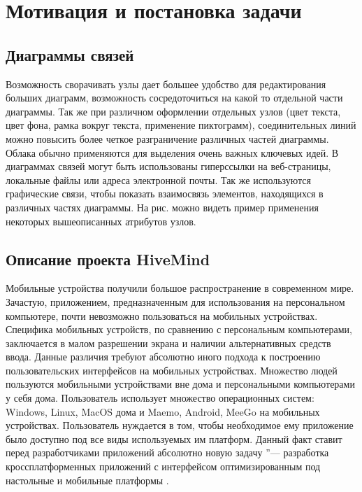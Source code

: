 \newpage

\chapter{Мотивация и постановка задачи}
\label{ch:chapter_1}

\section{Диаграммы связей}

Возможность сворачивать узлы дает большее удобство для редактирования больших
диаграмм, возможность сосредоточиться на какой то отдельной части диаграммы. Так
же при различном оформлении отдельных узлов (цвет текста, цвет фона, рамка
вокруг текста, применение пиктограмм), соединительных линий можно повысить более
четкое разграничение различных частей диаграммы. Облака обычно применяются для
выделения очень важных ключевых идей. В диаграммах связей могут быть
использованы гиперссылки на веб-страницы, локальные файлы или адреса электронной
почты. Так же используются графические связи, чтобы показать взаимосвязь
элементов, находящихся в различных частях диаграммы. На рис. можно видеть пример
применения некоторых вышеописанных атрибутов узлов.

\section{Описание проекта HiveMind}
\label{sec:project_summary}
Мобильные устройства получили большое распространение в современном мире.
Зачастую, приложением, предназначенным для использования на персональном
компьютере, почти невозможно пользоваться на мобильных устройствах. Специфика
мобильных устройств, по сравнению с персональным компьютерами, заключается в
малом разрешении экрана и наличии альтернативных средств ввода. Данные различия
требуют абсолютно иного подхода к построению пользовательских интерфейсов на
мобильных устройствах. Множество людей пользуются мобильными устройствами вне
дома и персональными компьютерами у себя дома. Пользователь использует множество
операционных систем: Windows, Linux, MacOS дома и Maemo, Android, MeeGo на
мобильных устройствах. Пользователь нуждается в том, чтобы необходимое ему
приложение было доступно под все виды используемых им платформ. Данный факт
ставит перед разработчиками приложений абсолютно новую задачу  ''--- разработка
кроссплатформенных приложений с интерфейсом оптимизированным под настольные и
мобильные платформы \cite{hivemind-8th-fruct}.

